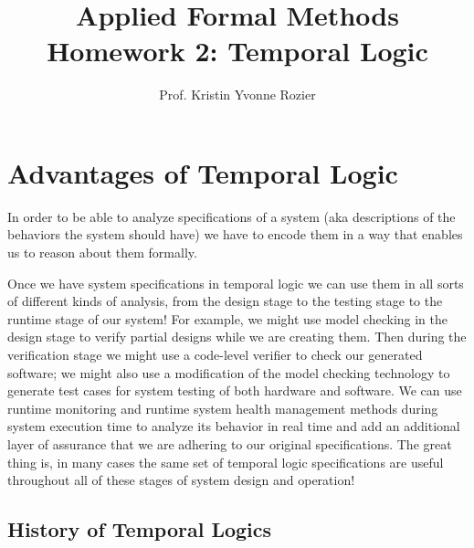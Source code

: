 \documentclass{elsarticle} %
\begin{document}
\title{Applied Formal Methods\\ Homework 2: Temporal Logic}

\author{Prof. Kristin Yvonne Rozier}


\maketitle



\bigskip




\section{Advantages of Temporal Logic}

In order to be able to analyze specifications of a system (aka descriptions of the behaviors the system should have) we have to encode them in a way that enables us to reason about them formally. 

Once we have system specifications in temporal logic we can use them in all sorts of different kinds of analysis, from the design stage to the testing stage to the runtime stage of our system! For example, we might use model checking in the design stage to verify partial designs while we are creating them. Then during the verification stage we might use a code-level verifier to check our generated software; we might also use a modification of the model checking technology to generate test cases for system testing of both hardware and software. We can use runtime monitoring and runtime system health management methods during system execution time to analyze its behavior in real time and add an additional layer of assurance that we are adhering to our original specifications. The great thing is, in many cases the same set of temporal logic specifications are useful throughout all of these stages of system design and operation!

\subsection{History of Temporal Logics}
\end{document}
